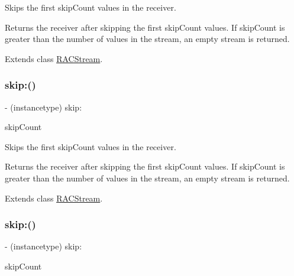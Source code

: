 Skips the first {\ttfamily skip\+Count} values in the receiver.

Returns the receiver after skipping the first {\ttfamily skip\+Count} values. If {\ttfamily skip\+Count} is greater than the number of values in the stream, an empty stream is returned. 

Extends class \mbox{\hyperlink{interface_r_a_c_stream_a1525f1607d8ff7f04a0afc1a5193436a}{R\+A\+C\+Stream}}.

\mbox{\label{category_r_a_c_stream_07_operations_08_a1525f1607d8ff7f04a0afc1a5193436a}} 
\subsubsection{\texorpdfstring{skip\+:()}{skip:()}\hspace{0.1cm}{\footnotesize\ttfamily [2/3]}}
{\footnotesize\ttfamily -\/ (instancetype) skip\+: \begin{DoxyParamCaption}\item[{(N\+S\+U\+Integer)}]{skip\+Count }\end{DoxyParamCaption}}

Skips the first {\ttfamily skip\+Count} values in the receiver.

Returns the receiver after skipping the first {\ttfamily skip\+Count} values. If {\ttfamily skip\+Count} is greater than the number of values in the stream, an empty stream is returned. 

Extends class \mbox{\hyperlink{interface_r_a_c_stream_a1525f1607d8ff7f04a0afc1a5193436a}{R\+A\+C\+Stream}}.

\mbox{\label{category_r_a_c_stream_07_operations_08_a1525f1607d8ff7f04a0afc1a5193436a}} 
\subsubsection{\texorpdfstring{skip\+:()}{skip:()}\hspace{0.1cm}{\footnotesize\ttfamily [3/3]}}
{\footnotesize\ttfamily -\/ (instancetype) skip\+: \begin{DoxyParamCaption}\item[{(N\+S\+U\+Integer)}]{skip\+Count }\end{DoxyParamCaption}}

